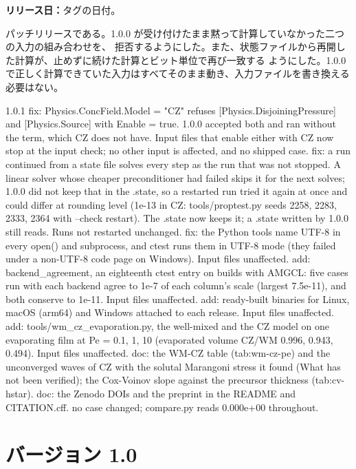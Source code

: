 \textbf{リリース日：}タグの日付。

パッチリリースである。1.0.0 が受け付けたまま黙って計算していなかった二つの入力の組み合わせを、
拒否するようにした。また、状態ファイルから再開した計算が、止めずに続けた計算とビット単位で再び一致する
ようにした。1.0.0 で正しく計算できていた入力はすべてそのまま動き、入力ファイルを書き換える
必要はない。

\begin{plain}
1.0.1
  fix: Physics.ConcField.Model = "CZ" refuses [Physics.DisjoiningPressure]
       and [Physics.Source] with Enable = true. 1.0.0 accepted both and ran
       without the term, which CZ does not have. Input files that enable
       either with CZ now stop at the input check; no other input is
       affected, and no shipped case.
  fix: a run continued from a state file solves every step as the run
       that was not stopped. A linear solver whose cheaper preconditioner
       had failed skips it for the next solves; 1.0.0 did not keep that in
       the .state, so a restarted run tried it again at once and could
       differ at rounding level (1e-13 in CZ: tools/proptest.py seeds 2258,
       2283, 2333, 2364 with --check restart). The .state now keeps it; a
       .state written by 1.0.0 still reads. Runs not restarted unchanged.
  fix: the Python tools name UTF-8 in every open() and subprocess, and
       ctest runs them in UTF-8 mode (they failed under a non-UTF-8 code
       page on Windows). Input files unaffected.
  add: backend_agreement, an eighteenth ctest entry on builds with AMGCL:
       five cases run with each backend agree to 1e-7 of each column's
       scale (largest 7.5e-11), and both conserve to 1e-11. Input files
       unaffected.
  add: ready-built binaries for Linux, macOS (arm64) and Windows attached
       to each release. Input files unaffected.
  add: tools/wm_cz_evaporation.py, the well-mixed and the CZ model on one
       evaporating film at Pe = 0.1, 1, 10 (evaporated volume CZ/WM 0.996,
       0.943, 0.494). Input files unaffected.
  doc: the WM-CZ table (tab:wm-cz-pe) and the unconverged waves of CZ with
       the solutal Marangoni stress it found (What has not been verified); the
       Cox-Voinov slope against the precursor thickness (tab:cv-hstar).
  doc: the Zenodo DOIs and the preprint in the README and CITATION.cff.
  no case changed; compare.py reads 0.000e+00 throughout.
\end{plain}

\section{バージョン 1.0}
\label{sec:rev:1-0}

